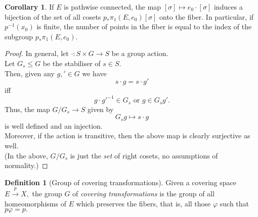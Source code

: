 \documentclass[12pt]{article}
\theoremstyle{definition}
\numberwithin{thm}{section}
\newtheorem{defn}[thm]{Definition}
\newtheorem{cor}[thm]{Corollary}
\begin{document}
\begin{cor}
	If $E$ is pathwise connected, the map $[\sigma] \mapsto e_0\cdot[\sigma]$ induces a bijection of the set of all cosets $p_*\pi_1(E, e_0)[\sigma]$ onto the fiber. In particular, if $p^{-1}(x_0)$ is finite, the number of points in the fiber is equal to the index of the subgroup $p_*\pi_1(E, e_0).$
\end{cor}
\begin{proof} 
	In general, let $\cdot:S \times G \to S$ be a group action.\\
	Let $G_s \le G$ be the stabiliser of $s \in S.$\\
	Then, given any $g, ' \in G$ we have
	\begin{equation*} 
		s\cdot g = s\cdot g'
	\end{equation*}
	iff
	\begin{equation*} 
		g\cdot g'^{-1} \in G_s \text{ or } g \in G_sg'.
	\end{equation*}
	Thus, the map $G/G_s \to S$ given by
	\begin{equation*} 
		G_sg \mapsto s\cdot g
	\end{equation*}
	is well defined and an injection.\\
	Moreover, if the action is transitive, then the above map is clearly surjective as well.\\
	(In the above, $G/G_s$ is just the \emph{set} of right cosets, no assumptions of normality.) 
\end{proof}

\begin{defn}[Group of covering transformations]
	Given a covering space $E \overset{p}{\longrightarrow} X,$ the group $G$ of \emph{covering transformations} is the group of all homeomorphisms of $E$ which preserves the fibers, that is, all those $\varphi$ such that $p\varphi = p.$

	\begin{center}
	\end{center}
\end{defn}
\end{document}

